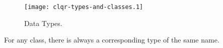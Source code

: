 \begin{figure}
\begin{center}
\begin{sideways}
      \texttt{[image: clqr-types-and-classes.1]}
    \end{sideways}
  \end{center}
              
  \caption{Data Types.}%
\end{figure}

For any class, there is always a corresponding type of the same name.

